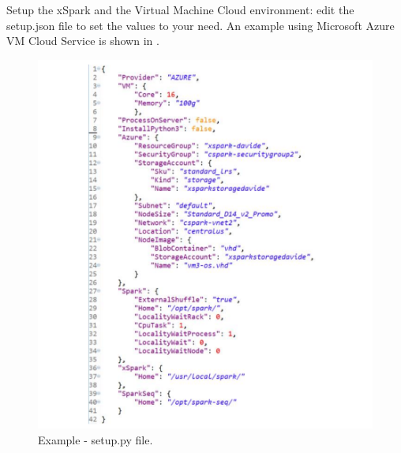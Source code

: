 Setup the xSpark and the Virtual Machine Cloud environment: edit the 
setup.json file to set the values to your need. An
example using Microsoft Azure VM Cloud Service is shown in .

\begin{figure}[thbp]
	\hspace*{-2.5cm}
	\centering
	\includegraphics[width=18cm]{images/xspark_dagsymb_setup.pdf}
	\caption{Example - setup.py file.}
	\label{fig:xspark_dagsymb_setup}
\end{figure}


